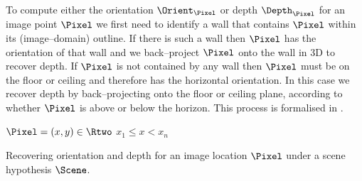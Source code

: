 To compute either the orientation $\Orient_{\Pixel}$ or depth
$\Depth_{\Pixel}$ for an image point $\Pixel$ we first need to
identify a wall that contains $\Pixel$ within its (image--domain)
outline. If there is such a wall then $\Pixel$ has the orientation of
that wall and we back--project $\Pixel$ onto the wall in 3D to recover
depth. If $\Pixel$ is not contained by any wall then $\Pixel$ must be
on the floor or ceiling and therefore has the horizontal
orientation. In this case we recover depth by back--projecting onto
the floor or ceiling plane, according to whether $\Pixel$ is above or
below the horizon. This process is formalised in
.

\begin{algorithm}[tb]
  \begin{algorithmic}
    \REQUIRE $\Pixel=(x,y)\in\Rtwo$
    \REQUIRE $x_1 \leq x < x_n$
        \STATE{}
        \ELSE
        \ENDIF
        \RETURN
      \ENDIF
    \ENDFOR
  \end{algorithmic}
  \caption{\label{alg:computing-from-scene}
    Recovering orientation and depth for an image location
    $\Pixel$ under a scene hypothesis $\Scene$.}
\end{algorithm}

